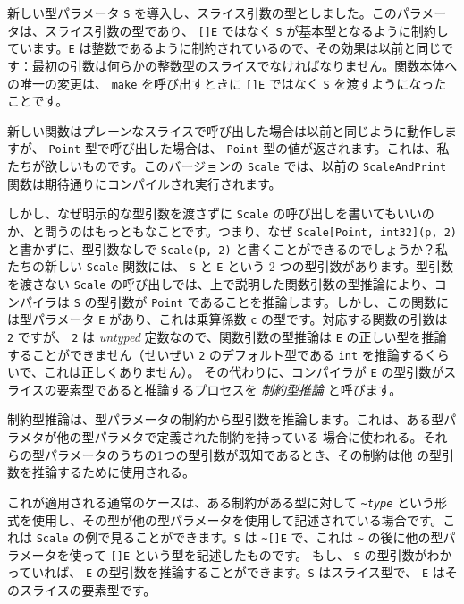 新しい型パラメータ \texttt{S}
を導入し、スライス引数の型としました。このパラメータは、スライス引数の型であり、
\texttt{{[}{]}E} ではなく \texttt{S}
が基本型となるように制約しています。\texttt{E}
は整数であるように制約されているので、その効果は以前と同じです：最初の引数は何らかの整数型のスライスでなければなりません。関数本体への唯一の変更は、
\texttt{make} を呼び出すときに \texttt{{[}{]}E} ではなく \texttt{S}
を渡すようになったことです。

新しい関数はプレーンなスライスで呼び出した場合は以前と同じように動作しますが、
\texttt{Point} 型で呼び出した場合は、 \texttt{Point}
型の値が返されます。これは、私たちが欲しいものです。このバージョンの
\texttt{Scale} では、以前の \texttt{ScaleAndPrint}
関数は期待通りにコンパイルされ実行されます。

しかし、なぜ明示的な型引数を渡さずに \texttt{Scale}
の呼び出しを書いてもいいのか、と問うのはもっともなことです。つまり、なぜ
\texttt{Scale{[}Point,\ int32{]}(p,\ 2)} と書かずに、型引数なしで
\texttt{Scale(p,\ 2)} と書くことができるのでしょうか？私たちの新しい
\texttt{Scale} 関数には、 \texttt{S} と \texttt{E} という 2
つの型引数があります。型引数を渡さない \texttt{Scale}
の呼び出しでは、上で説明した関数引数の型推論により、コンパイラは
\texttt{S} の型引数が \texttt{Point}
であることを推論します。しかし、この関数には型パラメータ \texttt{E}
があり、これは乗算係数 \texttt{c} の型です。対応する関数の引数は
\texttt{2} ですが、 \texttt{2} は \emph{untyped}
定数なので、関数引数の型推論は \texttt{E}
の正しい型を推論することができません（せいぜい \texttt{2}
のデフォルト型である \texttt{int}
を推論するくらいで、これは正しくありません）。
その代わりに、コンパイラが \texttt{E}
の型引数がスライスの要素型であると推論するプロセスを \emph{制約型推論}
と呼びます。

制約型推論は、型パラメータの制約から型引数を推論します。これは、ある型パラメタが他の型パラメタで定義された制約を持っている
場合に使われる。それらの型パラメータのうちの1つの型引数が既知であるとき、その制約は他
の型引数を推論するために使用される。

これが適用される通常のケースは、ある制約がある型に対して
\texttt{\textasciitilde{}}\emph{\texttt{type}}
という形式を使用し、その型が他の型パラメータを使用して記述されている場合です。これは
\texttt{Scale} の例で見ることができます。\texttt{S} は
\texttt{\textasciitilde{}{[}{]}E} で、これは \texttt{\textasciitilde{}}
の後に他の型パラメータを使って \texttt{{[}{]}E}
という型を記述したものです。 もし、 \texttt{S}
の型引数がわかっていれば、 \texttt{E}
の型引数を推論することができます。\texttt{S} はスライス型で、 \texttt{E}
はそのスライスの要素型です。

